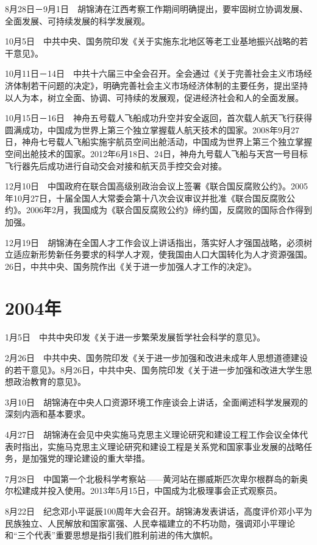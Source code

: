 \documentclass[10pt,a4paper,twocolumn]{book}
\begin{document}
8月28日－9月1日　胡锦涛在江西考察工作期间明确提出，要牢固树立协调发展、全面发展、可持续发展的科学发展观。

10月5日　中共中央、国务院印发《关于实施东北地区等老工业基地振兴战略的若干意见》。

10月11日－14日　中共十六届三中全会召开。全会通过《关于完善社会主义市场经济体制若干问题的决定》，明确完善社会主义市场经济体制的主要任务，提出坚持以人为本，树立全面、协调、可持续的发展观，促进经济社会和人的全面发展。

10月15日－16日　神舟五号载人飞船成功升空并安全返回，首次载人航天飞行获得圆满成功，中国成为世界上第三个独立掌握载人航天技术的国家。2008年9月27日，神舟七号载人飞船实施宇航员空间出舱活动，中国成为世界上第三个独立掌握空间出舱技术的国家。2012年6月18日、24日，神舟九号载人飞船与天宫一号目标飞行器先后成功进行自动交会对接和航天员手控交会对接。

12月10日　中国政府在联合国高级别政治会议上签署《联合国反腐败公约》。2005年10月27日，十届全国人大常委会第十八次会议审议并批准《联合国反腐败公约》。2006年2月，我国成为《联合国反腐败公约》缔约国，反腐败的国际合作得到加强。

12月19日　胡锦涛在全国人才工作会议上讲话指出，落实好人才强国战略，必须树立适应新形势新任务要求的科学人才观，使我国由人口大国转化为人才资源强国。26日，中共中央、国务院作出《关于进一步加强人才工作的决定》。

\section{2004年}

1月5日　中共中央印发《关于进一步繁荣发展哲学社会科学的意见》。

2月26日　中共中央、国务院印发《关于进一步加强和改进未成年人思想道德建设的若干意见》。8月26日，中共中央、国务院印发《关于进一步加强和改进大学生思想政治教育的意见》。

3月10日　胡锦涛在中央人口资源环境工作座谈会上讲话，全面阐述科学发展观的深刻内涵和基本要求。

4月27日　胡锦涛在会见中央实施马克思主义理论研究和建设工程工作会议全体代表时指出，实施马克思主义理论研究和建设工程是关系党和国家事业发展的战略任务，是加强党的理论建设的重大举措。

7月28日　中国第一个北极科学考察站——黄河站在挪威斯匹次卑尔根群岛的新奥尔松建成并投入使用。2013年5月15日，中国成为北极理事会正式观察员。

8月22日　纪念邓小平诞辰100周年大会召开。胡锦涛发表讲话，高度评价邓小平为民族独立、人民解放和国家富强、人民幸福建立的不朽功勋，强调邓小平理论和“三个代表”重要思想是指引我们胜利前进的伟大旗帜。
\end{document}
